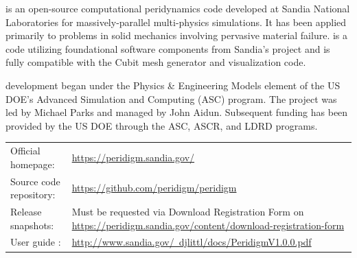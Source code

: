% 
%               
%          
% 


\marktool[\tooladdress]{\toolnameshort} is an open-source computational peridynamics code developed at Sandia National Laboratories for massively-parallel multi-physics simulations.  It has been applied primarily to problems in solid mechanics involving pervasive material failure.  \marktool[\tooladdress]{\toolnameshort} is a \Cpp{} code utilizing foundational software components from Sandia's  project and is fully compatible with the Cubit mesh generator and \marktool[\paraviewname]{\paraviewname} visualization code.

\marktool[\tooladdress]{\toolnameshort} development began under the Physics \& Engineering Models element of the US DOE's Advanced Simulation and Computing (ASC) program.  The project was led by Michael Parks and managed by John Aidun.  Subsequent funding has been provided by the US DOE through the ASC, ASCR, and LDRD programs.


{
\renewcommand{\arraystretch}{1.3}
\begin{tabularx}{\linewidth}{@{}lX}
Official homepage:      & \href{https://peridigm.sandia.gov/}{https://peridigm.sandia.gov/}\\
Source code repository: & \href{https://github.com/peridigm/peridigm}{https://github.com/peridigm/peridigm}\\
Release snapshots:      & Must be requested via Download Registration Form on \href{https://peridigm.sandia.gov/content/download-registration-form}{https://peridigm.sandia.gov/content/download-registration-form}\\
User guide \cite{PeridigmUserGuide100}:& \href{http://www.sandia.gov/~djlittl/docs/PeridigmV1.0.0.pdf}{http://www.sandia.gov/~djlittl/docs/PeridigmV1.0.0.pdf}
\end{tabularx}
}

